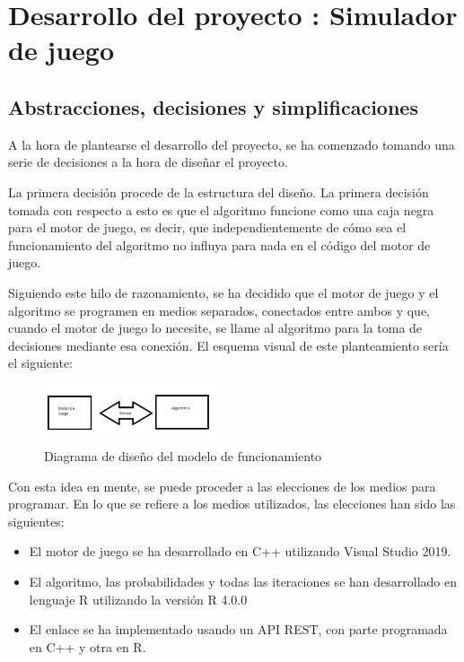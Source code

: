 \chapter{Desarrollo del proyecto : Simulador de juego}

\section {Abstracciones, decisiones y simplificaciones}
\label{sec:abstracciones}

A la hora de plantearse el desarrollo del proyecto, se ha comenzado tomando una serie de decisiones a la hora de diseñar el proyecto. 

La primera decisión procede de la estructura del diseño. La primera decisión tomada con respecto a esto es que el algoritmo funcione como una caja negra para el motor de juego, es decir, que independientemente de cómo sea el funcionamiento del algoritmo no influya para nada en el código del motor de juego. 

Siguiendo este hilo de razonamiento, se ha decidido que el motor de juego y el algoritmo se programen en medios separados, conectados entre ambos y que, cuando el motor de juego lo necesite, se llame al algoritmo para la toma de decisiones mediante esa conexión.
El esquema visual de este planteamiento sería el siguiente:
 
\begin{figure}[h]
\centering
\includegraphics[width=0.45\textwidth]{figuras/esquema.png}   
\caption{Diagrama de diseño del modelo de funcionamiento \cite{propiaPaint}}
\label{fig:esquema}
\end{figure}

Con esta idea en mente, se puede proceder a las elecciones de los medios para programar. En lo que se refiere a los medios utilizados, las elecciones han sido las siguientes:
 \begin{itemize}
\item El motor de juego se ha desarrollado en C++ utilizando Visual Studio 2019. 
\item El algoritmo, las probabilidades y todas las iteraciones se han desarrollado en lenguaje R utilizando la versión R 4.0.0
\item El enlace se ha implementado usando un API REST, con parte programada en C++ y otra en R.
\end{itemize}

